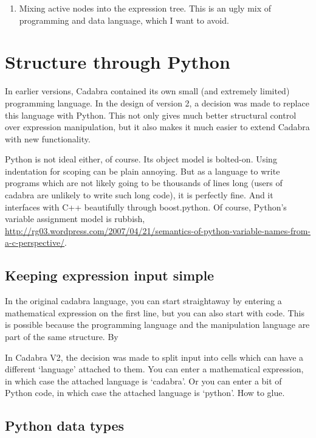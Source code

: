 \documentclass[11pt]{article}
\begin{document}
\begin{enumerate}
\item Mixing active nodes into the expression tree. This is an ugly
mix of programming and data language, which I want to avoid. 
\end{enumerate}

\section{Structure through Python}

In earlier versions, Cadabra contained its own small (and extremely
limited) programming language. In the design of version 2, a decision
was made to replace this language with Python. This not only gives
much better structural control over expression manipulation, but it
also makes it much easier to extend Cadabra with new functionality.

Python is not ideal either, of course. Its object model is bolted-on.
Using indentation for scoping can be plain annoying.  But as a
language to write programs which are not likely going to be thousands
of lines long (users of cadabra are unlikely to write such long code),
it is perfectly fine. And it interfaces with C++ beautifully through
boost.python. Of course, Python's variable assignment model is
rubbish,
\url{http://rg03.wordpress.com/2007/04/21/semantics-of-python-variable-names-from-a-c-perspective/}.


\subsection{Keeping expression input simple}

In the original cadabra language, you can start straightaway by
entering a mathematical expression on the first line, but you can also
start with code.  This is possible because the programming language
and the manipulation language are part of the same structure. By

In Cadabra V2, the decision was made to split input into cells which
can have a different `language' attached to them. You can enter a
mathematical expression, in which case the attached language is
`cadabra'. Or you can enter a bit of Python code, in which case the
attached language is `python'. How to glue.

\subsection{Python data types}
\end{document}
